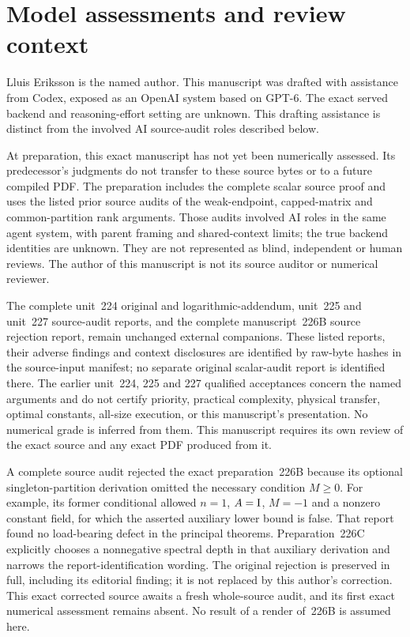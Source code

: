 \section{Model assessments and review context}\label{sec:review}
Lluis Eriksson is the named author. This manuscript was drafted with
assistance from Codex, exposed as an OpenAI system based on GPT-6. The exact
served backend and reasoning-effort setting are unknown. This drafting
assistance is distinct from the involved AI source-audit roles described below.

At preparation, this exact manuscript has not yet been numerically assessed.
Its predecessor's judgments do not transfer to these source bytes or to a
future compiled PDF. The preparation includes the complete scalar source proof
and uses the listed prior source audits of the weak-endpoint, capped-matrix
and common-partition rank arguments. Those audits involved AI roles in
the same agent system, with parent framing and shared-context limits; the
true backend identities are unknown. They are not represented as blind,
independent or human reviews. The author of this manuscript is not its
source auditor or numerical reviewer.

The complete unit~224 original and logarithmic-addendum, unit~225 and
unit~227 source-audit reports, and the complete manuscript~226B source
rejection report, remain unchanged external companions. These listed reports,
their adverse findings and context disclosures are identified by raw-byte
hashes in the source-input manifest; no separate original scalar-audit report
is identified there. The earlier unit~224, 225 and 227 qualified acceptances concern the named
arguments and do not certify priority, practical complexity, physical
transfer, optimal constants, all-size execution, or this manuscript's
presentation. No numerical grade is inferred from them. This manuscript
requires its own review of the exact source and any exact PDF produced from
it.

A complete source audit rejected the exact preparation~226B because its
optional singleton-partition derivation omitted the necessary condition
$M\ge0$. For example, its former conditional allowed $n=1$, $A=\mathrm I$,
$M=-1$ and a nonzero constant field, for which the asserted auxiliary lower
bound is false. That report found no load-bearing defect in the principal
theorems. Preparation~226C explicitly chooses a nonnegative spectral depth
in that auxiliary derivation and narrows the report-identification wording.
The original rejection is preserved in full, including its editorial finding;
it is not replaced by this author's correction. This exact corrected source
awaits a fresh whole-source audit, and its first exact numerical assessment
remains absent. No result of a render of~226B is assumed here.

